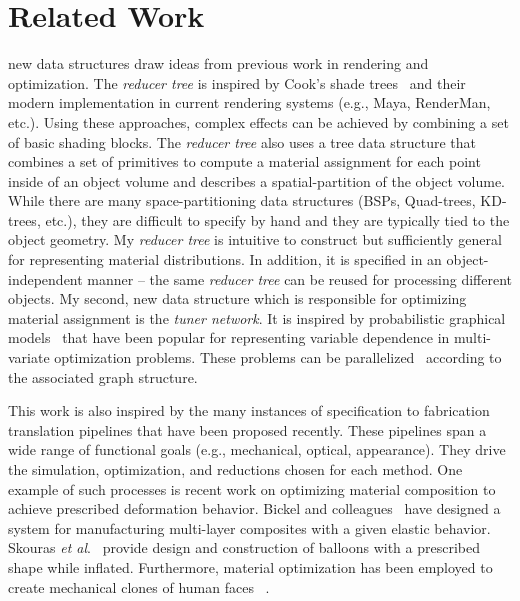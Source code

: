 \chapter{Related Work}
\label{chap:relate}
 new data structures draw ideas from previous work in rendering and optimization.
The \emph{reducer tree} is inspired by Cook's shade trees~\cite{Cook1984} and their modern implementation in current rendering systems (e.g., Maya, RenderMan, etc.). Using these approaches, complex effects can be achieved by combining a set of basic shading blocks. The \emph{reducer tree} also uses a tree data structure that combines a set of primitives to compute a material assignment for each point inside of an object volume and describes a spatial-partition of the object volume. While there are many space-partitioning data structures (BSPs, Quad-trees, KD-trees, etc.), they are difficult to specify by hand and they are typically tied to the object geometry.
My \emph{reducer tree} is intuitive to construct but sufficiently general for representing material distributions.
In addition, it is specified in an object-independent manner -- the same \emph{reducer tree} can be reused for processing different objects.
My second, new data structure which is responsible for optimizing material assignment is the \emph{tuner network}.
It is inspired by probabilistic graphical models~\cite{Jordan:1999} that have been popular for representing variable dependence in multi-variate optimization problems.
These problems can be parallelized~\cite{GraphLab} according to the associated graph structure.

This work is also inspired by the many instances of specification to fabrication translation pipelines that have been proposed recently.
These pipelines span a wide range of functional goals (e.g., mechanical, optical, appearance).
They drive the simulation, optimization, and reductions chosen for each method. 
One example of such processes is recent work on optimizing material composition
to achieve prescribed deformation behavior. 
Bickel and colleagues~ have designed a system
for manufacturing multi-layer composites with a given elastic behavior.
Skouras \textit{et al}.~ provide design and construction of balloons
with a prescribed shape while inflated.
Furthermore, material optimization has been employed to create mechanical clones of human faces ~\cite{Bickel:2012}.

